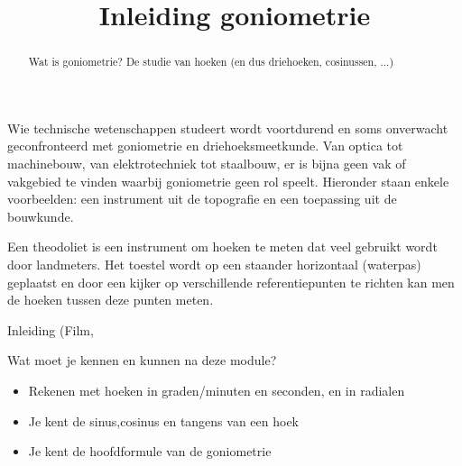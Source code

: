 \documentclass{ximera}
\title[Examples:]{Inleiding goniometrie}
\begin{document}
\begin{abstract}
	Wat is goniometrie? De studie van hoeken (en dus driehoeken, cosinussen, ...)
\end{abstract}
\maketitle

Wie technische wetenschappen studeert wordt voortdurend en soms onverwacht geconfronteerd met goniometrie en driehoeksmeetkunde. Van optica tot machinebouw, van elektrotechniek tot staalbouw, er is bijna geen vak of vakgebied te vinden waarbij goniometrie geen rol speelt. Hieronder staan enkele voorbeelden: een instrument uit de topografie en een toepassing uit de bouwkunde.

Een theodoliet is een instrument om hoeken te meten dat veel gebruikt wordt door landmeters. Het toestel wordt op een staander horizontaal (waterpas) geplaatst en door een kijker op verschillende referentiepunten te richten kan men de hoeken tussen deze punten meten.


\begin{expandable}
	Inleiding (Film, 
 \begin{center}
 \end{center}
\end{expandable}



Wat moet je kennen en kunnen na deze module?

\begin{foldable}
	\begin{itemize}
		\item Rekenen met hoeken in graden/minuten en seconden, en in radialen
		\item Je kent de sinus,cosinus en tangens van een hoek
		\item Je kent de hoofdformule van de goniometrie
	\end{itemize}
\end{foldable}
\end{document}
